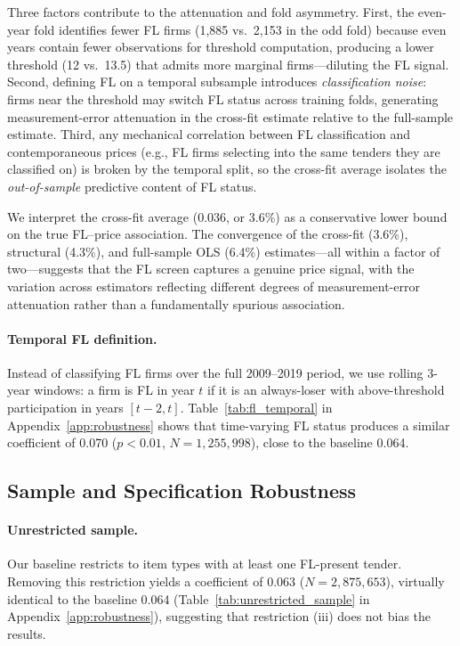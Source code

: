 Three factors contribute to the attenuation and fold asymmetry. First,
the even-year fold identifies fewer FL firms (1,885 vs.\ 2,153 in
the odd fold) because even years contain fewer observations for
threshold computation, producing a lower threshold (12 vs.\ 13.5)
that admits more marginal firms---diluting the FL signal. Second,
defining FL on a temporal subsample introduces \emph{classification
noise}: firms near the threshold may switch FL status across training
folds, generating measurement-error attenuation in the cross-fit
estimate relative to the full-sample estimate. Third, any mechanical
correlation between FL classification and contemporaneous prices
(e.g., FL firms selecting into the same tenders they are classified
on) is broken by the temporal split, so the cross-fit average isolates
the \emph{out-of-sample} predictive content of FL status.

We interpret the cross-fit average (0.036, or 3.6\%) as a conservative
lower bound on the true FL--price association. The convergence of the
cross-fit (3.6\%), structural (4.3\%), and full-sample OLS (6.4\%)
estimates---all within a factor of two---suggests that the FL screen
captures a genuine price signal, with the variation across estimators
reflecting different degrees of measurement-error attenuation rather
than a fundamentally spurious association.

\paragraph{Temporal FL definition.}
Instead of classifying FL firms over the full 2009--2019 period, we use
rolling 3-year windows: a firm is FL in year $t$ if it is an
always-loser with above-threshold participation in years $[t-2, t]$.
Table~\ref{tab:fl_temporal} in Appendix~\ref{app:robustness} shows
that time-varying FL status produces a similar coefficient of 0.070
($p < 0.01$, $N = 1{,}255{,}998$), close to the baseline 0.064.

\subsection{Sample and Specification Robustness}

\paragraph{Unrestricted sample.}
Our baseline restricts to item types with at least one FL-present
tender. Removing this restriction yields a coefficient of 0.063 ($N =
2{,}875{,}653$), virtually identical to the baseline 0.064
(Table~\ref{tab:unrestricted_sample} in Appendix~\ref{app:robustness}),
suggesting that restriction (iii) does not bias the results.

